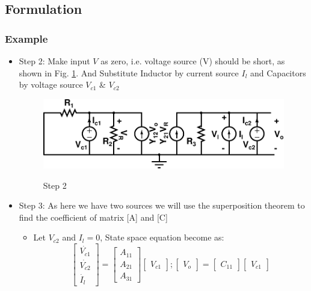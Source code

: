 \documentclass{beamer}
\begin{document}
\subsection*{Formulation}

\begin{frame}
\frametitle{Example}
\begin{small}
\begin{itemize}
\item Step 2: Make input $V$ as zero, i.e. voltage source (V) should be short, as shown in Fig. \ref{transa}. And Substitute Inductor by current source $I_l$ and Capacitors by voltage source $V_{c1}$ \& $V_{c2}$

\begin{figure}[h!]
\centering
{\label{method}\includegraphics[totalheight=.2\textheight,width=.6\textwidth]{images/Transa}}
\caption{Step 2}
\label{transa}
\end{figure} 

\item Step 3: As here we have two sources we will use the superposition theorem to find the coefficient of matrix [A] and [C]
\begin{itemize}
\item{Let $V_{c2}$ and $I_l=0$, State space equation become as:} \\

\[ \left[ \begin{array}{cc}
\dot{V_{c1}} \\
\dot{V_{c2}} \\
\dot{I_l}
\end{array} \right]
=
\left[ \begin{array}{ccc}
A_{11} \\
A_{21} \\
A_{31} 
\end{array} \right]
%
\left[ \begin{array}{c}
{V_{c1}}
\end{array} \right];
\left[ \begin{array}{c}
{V_{o}}
\end{array} \right]
=
\left[ \begin{array}{c}
{C_{11}}
\end{array} \right]
\left[ \begin{array}{c}
{V_{c1}}
\end{array} \right]
\]
\end{itemize}
\end{itemize}
\end{small}
\end{frame}
\end{document}
